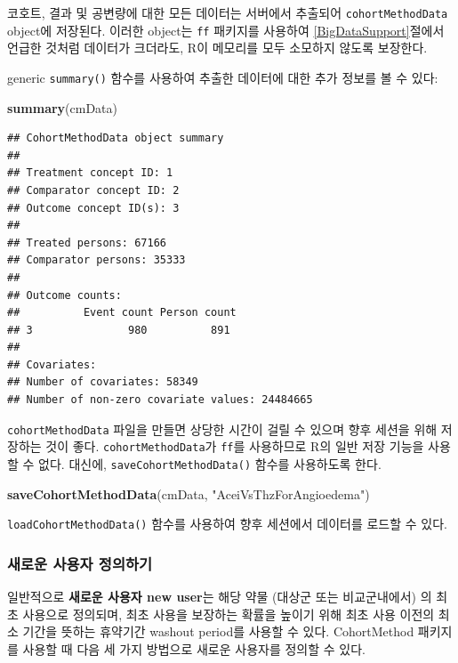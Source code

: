 \documentclass[11pt]{book}
\newenvironment{Shaded}{\begin{snugshade}}{\end{snugshade}}
\newcommand{\KeywordTok}[1]{\textcolor[rgb]{0.13,0.29,0.53}{\textbf{#1}}}
\newcommand{\StringTok}[1]{\textcolor[rgb]{0.31,0.60,0.02}{#1}}
\newcommand{\NormalTok}[1]{#1}
\theoremstyle{definition}
\theoremstyle{definition}
\theoremstyle{definition}
\theoremstyle{remark}
\begin{document}
코호트, 결과 및 공변량에 대한 모든 데이터는 서버에서 추출되어
\texttt{cohortMethodData} object에 저장된다. 이러한 object는 \texttt{ff}
패키지를 사용하여 \ref{BigDataSupport}절에서 언급한 것처럼 데이터가
크더라도, R이 메모리를 모두 소모하지 않도록 보장한다.

generic \texttt{summary()} 함수를 사용하여 추출한 데이터에 대한 추가
정보를 볼 수 있다:

\begin{Shaded}
\begin{Highlighting}[]
\KeywordTok{summary}\NormalTok{(cmData)}
\end{Highlighting}
\end{Shaded}

\begin{verbatim}
## CohortMethodData object summary
## 
## Treatment concept ID: 1
## Comparator concept ID: 2
## Outcome concept ID(s): 3
## 
## Treated persons: 67166
## Comparator persons: 35333
## 
## Outcome counts:
##          Event count Person count
## 3               980          891
## 
## Covariates:
## Number of covariates: 58349
## Number of non-zero covariate values: 24484665
\end{verbatim}

\texttt{cohortMethodData} 파일을 만들면 상당한 시간이 걸릴 수 있으며
향후 세션을 위해 저장하는 것이 좋다. \texttt{cohortMethodData}가
\texttt{ff}를 사용하므로 R의 일반 저장 기능을 사용할 수 없다. 대신에,
\texttt{saveCohortMethodData()} 함수를 사용하도록 한다.

\begin{Shaded}
\begin{Highlighting}[]
\KeywordTok{saveCohortMethodData}\NormalTok{(cmData, }\StringTok{"AceiVsThzForAngioedema"}\NormalTok{)}
\end{Highlighting}
\end{Shaded}

\texttt{loadCohortMethodData()} 함수를 사용하여 향후 세션에서 데이터를
로드할 수 있다.

\subsubsection*{새로운 사용자 정의하기}\label{--}

일반적으로 \textbf{새로운 사용자 new user}는 해당 약물 (대상군 또는
비교군내에서) 의 최초 사용으로 정의되며, 최초 사용을 보장하는 확률을
높이기 위해 최초 사용 이전의 최소 기간을 뜻하는 휴약기간 washout
period를 사용할 수 있다. CohortMethod 패키지를 사용할 때 다음 세 가지
방법으로 새로운 사용자를 정의할 수 있다.
\end{document}
